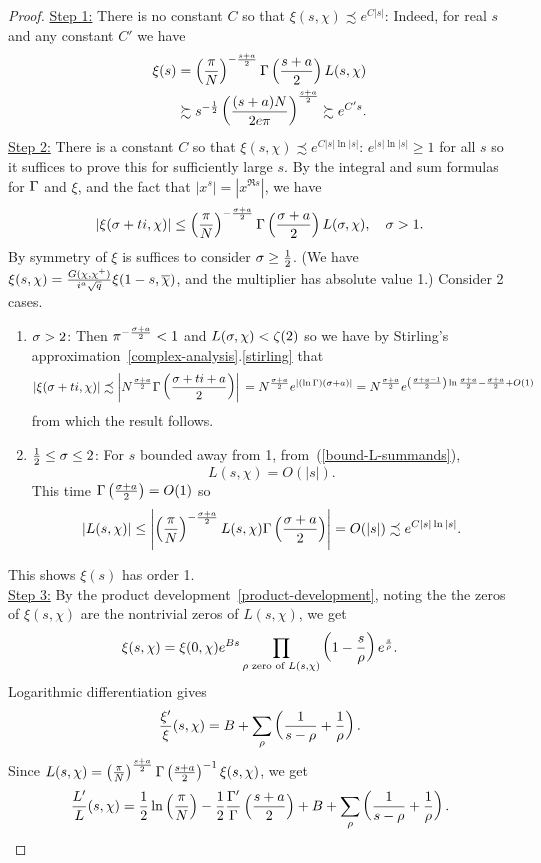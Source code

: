 \begin{proof}
\noindent \underline{Step 1:} There is no constant $C$ so that $\xi(s,\chi)\precsim e^{C|s|}$: Indeed, for real $s$ and any constant $C'$ we have
\begin{align*}
\xi(s)&=\left( {\frac{\pi}{N}} \right)^{-\frac{s+a}2}\Gamma\left( {\frac{s+a}{2}} \right)L(s,\chi)\\
&\succsim s^{-\frac{1}{2}}\left( {\frac{(s+a)N}{2e\pi}} \right)^{\frac{s+a}2}
\succsim e^{C's}.
\end{align*}
\noindent\underline{Step 2:} There is a constant $C$ so that $\xi(s,\chi)\precsim e^{C|s|\ln|s|}$: $e^{|s|\ln|s|}\ge1$ for all $s$ so it suffices to prove this for sufficiently large $s$. By the integral and sum formulas for $\Gamma$ and $\xi$, and the fact that $|x^s|=|x^{\Re s}|$, we have
\[
|\xi(\sigma+ti,\chi)|\le \left( {\frac{\pi}{N}} \right)^{-\frac{\sigma+a}{2}}\Gamma\left( {\frac{\sigma+a}{2}} \right)L(\sigma,\chi),\quad \sigma>1.
\]
By symmetry of $\xi$ is suffices to consider $\sigma\ge \frac{1}{2}$. (We have $\xi(s,\chi)=\frac{G(\chi,\chi^+)}{i^a\sqrt q}\xi(1-s,\overline{\chi})$, and the multiplier has absolute value 1.) Consider 2 cases.
\begin{enumerate}
\item
$\sigma>2$: Then $\pi^{-\frac{\sigma+a}{2}}<1$ and $L(\sigma,\chi)<\zeta(2)$ so we have by Stirling's approximation~\ref{complex-analysis}.\ref{stirling} that
\[
|\xi(\sigma+ti,\chi)|\precsim
\left| {N^{\frac{\sigma+a}{2}}\Gamma\left( {\frac{\sigma+ti+a}{2}} \right)} \right|\\
=N^{\frac{\sigma+a}{2}}e^{|(\ln\Gamma)(\sigma+a)|}=N^{\frac{\sigma+a}{2}}e^{\left( {\frac{\sigma+a-1}2} \right)\ln\frac{\sigma+a}2 -\frac{\sigma+a}2+O(1)}
\]
from which the result follows.
\item
$\frac12\le \sigma\le 2$: %
For $s$ bounded away from 1, from~(\ref{bound-L-summands}),
\[
L(s,\chi)=O(|s|).
\]
This time $\Gamma\left( {\frac{\sigma+a}{2}} \right)=O(1)$ so
\[
|L(s,\chi)|\le \left| {
\left( {\frac{\pi}{N}} \right)^{-\frac{\sigma+a}2}L(s,\chi)\Gamma\left( {\frac{\sigma+a}{2}} \right)} \right|
=O(|s|)\precsim e^{C|s|\ln|s|}.
\]
\end{enumerate}
This shows $\xi(s)$ has order 1.\\

\noindent\underline{Step 3:} By the product development~\ref{product-development}, noting the the zeros of $\xi(s,\chi)$ are the nontrivial zeros of $L(s,\chi)$, we get
\[
\xi(s,\chi)=\xi(0,\chi)e^{Bs}\prod_{\rho\text{ zero of }L(s,\chi)}\left( {1-\frac{s}{\rho}} \right)e^{\frac s{\rho}}.
\]
Logarithmic differentiation gives
\[
\frac{\xi'}{\xi}(s,\chi)=B+\sum_{\rho} \left( {\frac{1}{s-\rho}+\frac{1}{\rho}} \right).
\]
Since $L(s,\chi)=\left( {\frac{\pi}{N}} \right)^{\frac{s+a}2}\Gamma\left( {\frac{s+a}{2}} \right)^{-1}\xi(s,\chi)$, we get
\[
\frac{L'}{L}(s,\chi)=\frac{1}{2}\ln\left( {\frac{\pi}{N}} \right) -\frac{1}{2}\frac{\Gamma'}{\Gamma}\left( {\frac{s+a}{2}} \right)+B+\sum_{\rho} \left( {\frac{1}{s-\rho}+\frac{1}{\rho}} \right).\qedhere
\]
\end{proof}
